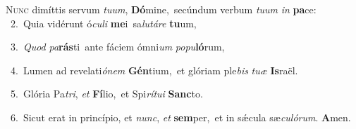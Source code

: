 \lettrine{\initial\textcolor{\initialcolor}{N}}{unc} dimíttis servum \textit{tu}\-\textit{um}, \textbf{Dó}\-mine,~\star secúndum verbum \textit{tu}\-\textit{um} \textit{in} \textbf{pa}\-ce:\\
{\numbfont\textcolor{\numbcolor}{~2.}}~Quia vidérunt ó\-\textit{cu}\-\textit{li} \textbf{me}\-i~\star sa\-\textit{lu}\-\textit{tá}\textit{re} \textbf{tu}\-um,\par
{\numbfont\textcolor{\numbcolor}{~3.}}~\textit{Quod} \textit{pa}\-\textbf{rás}ti~\star ante fáciem ómni\textit{um} \textit{po}\-\textit{pu}\textbf{ló}rum,\par
{\numbfont\textcolor{\numbcolor}{~4.}}~Lumen ad revelati\-\textit{ó}\-\textit{nem} \textbf{Gén}\-tium,~\star et glóriam ple\textit{bis} \textit{tu}\-\textit{æ} \textbf{Is}\-raël.\par
{\numbfont\textcolor{\numbcolor}{~5.}}~Glória Pa\-\textit{tri}\-, \textit{et} \textbf{Fí}\-lio,~\star et Spi\-\textit{rí}\-\textit{tu}\textit{i} \textbf{Sanc}\-to.\par
{\numbfont\textcolor{\numbcolor}{~6.}}~Sicut erat in princípio, et \textit{nunc}\-, \textit{et} \textbf{sem}\-per,~\star et in sǽcula sæ\-\textit{cu}\-\textit{ló}\textit{rum}. \textbf{A}\-men.\par

